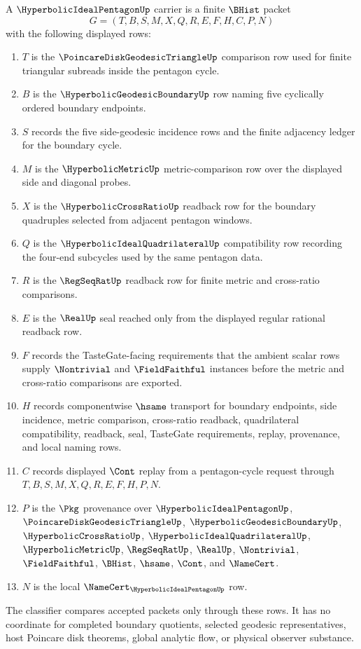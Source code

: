 \begin{definition}
\label{def:hyperbolic-ideal-pentagon-carrier}
A $\HyperbolicIdealPentagonUp$ carrier is a finite $\BHist$ packet
$$
G=(T,B,S,M,X,Q,R,E,F,H,C,P,N)
$$
with the following displayed rows:
\begin{enumerate}
\item $T$ is the $\PoincareDiskGeodesicTriangleUp$ comparison row used for finite triangular subreads inside the pentagon cycle.
\item $B$ is the $\HyperbolicGeodesicBoundaryUp$ row naming five cyclically ordered boundary endpoints.
\item $S$ records the five side-geodesic incidence rows and the finite adjacency ledger for the boundary cycle.
\item $M$ is the $\HyperbolicMetricUp$ metric-comparison row over the displayed side and diagonal probes.
\item $X$ is the $\HyperbolicCrossRatioUp$ readback row for the boundary quadruples selected from adjacent pentagon windows.
\item $Q$ is the $\HyperbolicIdealQuadrilateralUp$ compatibility row recording the four-end subcycles used by the same pentagon data.
\item $R$ is the $\RegSeqRatUp$ readback row for finite metric and cross-ratio comparisons.
\item $E$ is the $\RealUp$ seal reached only from the displayed regular rational readback row.
\item $F$ records the TasteGate-facing requirements that the ambient scalar rows supply $\Nontrivial$ and $\FieldFaithful$ instances before the metric and cross-ratio comparisons are exported.
\item $H$ records componentwise $\hsame$ transport for boundary endpoints, side incidence, metric comparison, cross-ratio readback, quadrilateral compatibility, readback, seal, TasteGate requirements, replay, provenance, and local naming rows.
\item $C$ records displayed $\Cont$ replay from a pentagon-cycle request through $T,B,S,M,X,Q,R,E,F,H,P,N$.
\item $P$ is the $\Pkg$ provenance over $\HyperbolicIdealPentagonUp$, $\PoincareDiskGeodesicTriangleUp$, $\HyperbolicGeodesicBoundaryUp$, $\HyperbolicCrossRatioUp$, $\HyperbolicIdealQuadrilateralUp$, $\HyperbolicMetricUp$, $\RegSeqRatUp$, $\RealUp$, $\Nontrivial$, $\FieldFaithful$, $\BHist$, $\hsame$, $\Cont$, and $\NameCert$.
\item $N$ is the local $\NameCert_{\HyperbolicIdealPentagonUp}$ row.
\end{enumerate}
The classifier compares accepted packets only through these rows. It has no coordinate for completed boundary quotients, selected geodesic representatives, host Poincare disk theorems, global analytic flow, or physical observer substance.
\end{definition}

